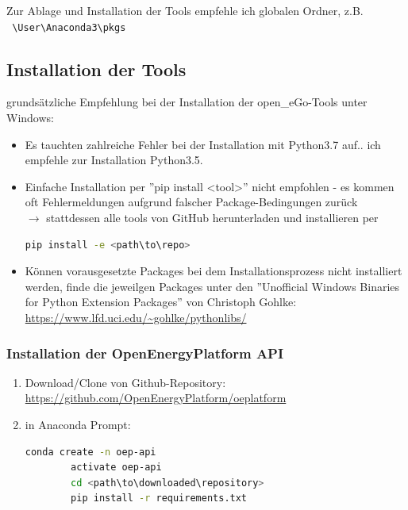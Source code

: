 \documentclass[
a4paper,     %
12pt         %
]{scrartcl}  %
\begin{document}
Zur Ablage und Installation der Tools empfehle ich globalen Ordner, z.B.\\
\noindent \hspace*{15mm} \texttt{ \textbackslash User\textbackslash Anaconda3\textbackslash pkgs}

\subsection{Installation der Tools}
grundsätzliche Empfehlung bei der Installation der open\_eGo-Tools unter Windows:
\begin{itemize}
\item Es tauchten zahlreiche Fehler bei der Installation mit Python3.7 auf.. ich empfehle zur Installation Python3.5.
\item Einfache Installation per ''pip install <tool>'' nicht empfohlen - es kommen oft Fehlermeldungen aufgrund falscher Package-Bedingungen zurück\\
$\rightarrow$ stattdessen alle tools von GitHub herunterladen und installieren per
 \begin{lstlisting}[language=bash]
 pip install -e <path\to\repo>
 \end{lstlisting}

\item Können vorausgesetzte Packages bei dem Installationsprozess nicht installiert werden, finde die jeweilgen Packages unter den ''Unofficial Windows Binaries for Python Extension Packages'' von Christoph Gohlke:
\url{https://www.lfd.uci.edu/~gohlke/pythonlibs/}
\end{itemize}

\subsubsection{Installation der OpenEnergyPlatform API}
\begin{enumerate}
	\item Download/Clone von Github-Repository: \url{https://github.com/OpenEnergyPlatform/oeplatform}
	\item in Anaconda Prompt:
	\begin{lstlisting}[language=bash]
		conda create -n oep-api
		activate oep-api
		cd <path\to\downloaded\repository>
		pip install -r requirements.txt
	\end{lstlisting}
\end{enumerate}
\end{document}
